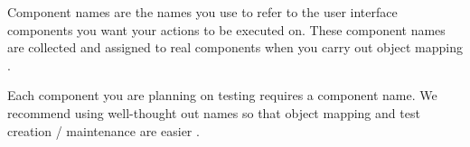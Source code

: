 Component names are the names you use to refer to the user interface components you want your actions to be executed on. These component names are collected and assigned to real components when you carry out object mapping . 


Each component you are planning on testing requires a component name. We recommend using well-thought out names so that object mapping and test creation / maintenance are easier .

